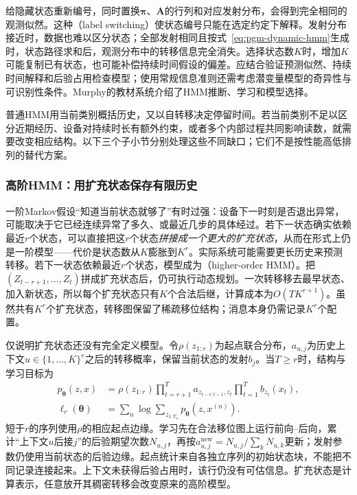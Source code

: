 给隐藏状态重新编号，同时置换$\bm{\pi}$、$\bm{A}$的行列和对应发射分布，会得到完全相同的观测似然。这种（label switching）使状态编号只能在选定约定下解释。发射分布接近时，数据也难以区分状态；全部发射相同且按式~\eqref{eq:pgm-dynamic-hmm}生成时，状态路径求和后，观测分布中的转移信息完全消失。选择状态数$K$时，增加$K$可能复制已有状态，也可能补偿持续时间假设的偏差。应结合验证预测似然、持续时间解释和后验占用检查模型；使用常规信息准则还需考虑潜变量模型的奇异性与可识别性条件。Murphy的教材系统介绍了HMM推断、学习和模型选择。

普通HMM用当前类别概括历史，又以自转移决定停留时间。若当前类别不足以区分近期经历、设备对持续时长有额外约束，或者多个内部过程共同影响读数，就需要改变相应结构。以下三个子小节分别处理这些不同缺口；它们不是按性能高低排列的替代方案。

\subsubsection{高阶HMM：用扩充状态保存有限历史}
\label{sec:pgm-dynamic-higher-order}

一阶Markov假设“知道当前状态就够了”有时过强：设备下一时刻是否退出异常，可能取决于它已经连续异常了多久、或最近几步的具体经过。若下一状态确实依赖最近$r$个状态，可以直接把这$r$个状态\emph{拼接成一个更大的扩充状态}，从而在形式上仍是一阶模型——代价是状态数从$K$膨胀到$K^r$。实际系统可能需要更长历史来预测转移。若下一状态依赖最近$r$个状态，模型成为（higher-order HMM）。把$(Z_{t-r+1},\ldots,Z_t)$拼成扩充状态后，仍可执行动态规划。一次转移移去最早状态、加入新状态，所以每个扩充状态只有$K$个合法后继，计算成本为$O(TK^{r+1})$。虽然共有$K^r$个扩充状态，转移图保留了稀疏移位结构；消息本身仍需记录$K^r$个配置。

仅说明扩充状态还没有完全定义模型。令$\rho(z_{1:r})$为起点联合分布，$a_{u,j}$为历史上下文$u\in\{1,\ldots,K\}^r$之后的转移概率，保留当前状态的发射$b_j$。当$T\geq r$时，结构与学习目标为
\begin{equation}
  \begin{aligned}
    p_{\bm\theta}(z,x)&=\rho(z_{1:r})
       \prod_{t=r+1}^{T}a_{z_{t-r:t-1},z_t}
       \prod_{t=1}^{T}b_{z_t}(x_t),\\
    \ell_r(\bm\theta)&=\sum_n\log\sum_{z_{1:T_n}}
                       p_{\bm\theta}(z,x^{(n)}).
  \end{aligned}
  \label{eq:pgm-dynamic-higher-objective}
\end{equation}
短于$r$的序列使用$\rho$的相应起点边缘。学习先在合法移位图上运行前向--后向，累计“上下文$u$后接$j$”的后验期望次数$N_{u,j}$，再按$a_{u,j}^{\mathrm{new}}=N_{u,j}/\sum_kN_{u,k}$更新；发射参数仍使用当前状态的后验边缘。起点统计来自各独立序列的初始状态块，不能把不同记录连接起来。上下文未获得后验占用时，该行仍没有可估信息。扩充状态是计算表示，任意放开其稠密转移会改变原来的高阶模型。

